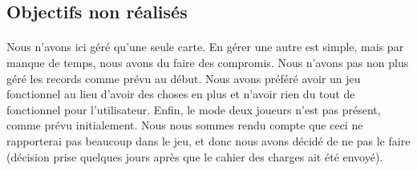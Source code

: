 \subsection{Objectifs non réalisés}
\paragraph{} Nous n'avons ici géré qu'une seule carte. En gérer une autre est simple, mais par manque de temps, nous avons du faire des compromis. Nous n'avons pas non plus géré les records comme prévu au début. Nous avons préféré avoir un jeu fonctionnel au lieu d'avoir des choses en plus et n'avoir rien du tout de fonctionnel pour l'utilisateur. Enfin, le mode deux joueurs n'est pas présent, comme prévu initialement. Nous nous sommes rendu compte que ceci ne rapporterai pas beaucoup dans le jeu, et donc nous avons décidé de ne pas le faire (décision prise quelques jours après que le cahier des charges ait été envoyé).
